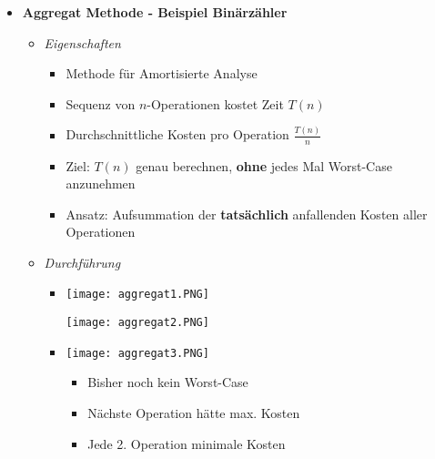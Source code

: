 \begin{itemize}
\pagebreak

        \item \textbf{Aggregat Methode - Beispiel Binärzähler}
            \begin{itemize}
                \item \textit{Eigenschaften}
                    \begin{itemize}
                        \item Methode für Amortisierte Analyse
                        \item Sequenz von $n$-Operationen kostet Zeit $T(n)$
                        \item Durchschnittliche Kosten pro Operation $\frac{T(n)}{n}$
                        \item Ziel: $T(n)$ genau berechnen, \textbf{ohne} jedes Mal Worst-Case anzunehmen
                        \item Ansatz: Aufsummation der \textbf{tatsächlich} anfallenden Kosten aller Operationen
                    \end{itemize}
                \item \textit{Durchführung}
                    \begin{itemize}
                        \item[]
                            \begin{minipage}{0.4\textwidth}
                                \texttt{[image: aggregat1.PNG]}
                            \end{minipage}
                            \begin{minipage}{0.5\textwidth}
                                \texttt{[image: aggregat2.PNG]}
                            \end{minipage}
                        \item[]
                            \begin{minipage}{0.4\textwidth}
                                \texttt{[image: aggregat3.PNG]}
                            \end{minipage}
                            \begin{minipage}{0.5\textwidth}
                                \begin{itemize}
                                    \item Bisher noch kein Worst-Case
                                    \item Nächste Operation hätte max. Kosten
                                    \item Jede 2. Operation minimale Kosten

\end{itemize}
\end{minipage}
\end{itemize}
\end{itemize}
\end{itemize}

